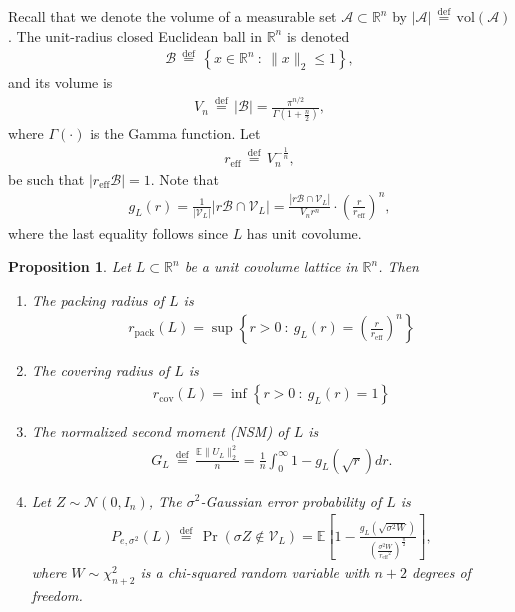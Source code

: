 \documentclass[article,doublecolumn]{IEEEtran}
\newcommand{\EE}{{\mathbb{E}}}
\newcommand{\df}{{\, \stackrel{\mathrm{def}}{=}\, }}
\newcommand{\R}{{\mathbb{R}}}
\newcommand{\AAA}{{\mathcal{A}}}
\newcommand{\Vol}{{\mathrm{vol}}}
\newcommand{\mVL}{{\mathcal{V}_L}}
\newcommand{\mBeuc}{{\mathcal{B}}}
\newcommand{\rpack}{{r_{\mathrm{pack}}}}
\newcommand{\rcov}{{r_{\mathrm{cov}}}}
\newcommand{\reff}{{r_{\mathrm{eff}}}}
\newcommand{\VcdfL}{g_L}
\newcommand{\Pesig}{P_{e,\sigma^2}}
\newtheorem{prop}[thm]{Proposition}
\begin{document}
Recall that we denote the volume of a measurable set $\AAA\subset\R^n$ by $|\AAA|\df\Vol(\AAA)$. The unit-radius closed Euclidean ball in $\R^n$ is denoted
\begin{align}
\mBeuc\df\left\{x\in \R^n~:~\|x\|_2\leq 1 \right\},    
\end{align}
and its volume is
\begin{align}
V_n\df |\mBeuc|=\frac{\pi^{n/2}}{\Gamma(1+\frac{n}{2})},
\label{eq:Vndef}
\end{align}
where $\Gamma(\cdot)$ is the Gamma function. Let
\begin{align}
\reff\df V_n^{-\frac{1}{n}},    
\end{align}
be such that $|\reff \mBeuc|=1$.
Note that
\begin{align}
\VcdfL(r)=\frac{1}{|\mVL|}\left| r\mBeuc\cap \mVL\right|=\frac{\left| r\mBeuc\cap \mVL\right|}{V_n r^n}\cdot\left(\frac{r}{\reff}\right)^n,   
\label{eq:gasIntersecVol}
\end{align}
where the last equality follows since $L$ has unit covolume.


\begin{prop}
\label{prop:fundviacdf}
Let $L\subset \R^n$ be a unit covolume lattice in $\R^n$. Then
\begin{enumerate}
    \item The packing radius of $L$ is
    \begin{align}
     \rpack(L)=\sup\left\{r>0~:~\VcdfL(r)=\left(\frac{r}{\reff} \right)^n \right\}  
    \end{align}
    \item The covering radius of $L$ is
    \begin{align}
     \rcov(L)=\inf\left\{r>0~:~\VcdfL(r)= 1 \right\}  
    \end{align}
    \item The normalized second moment (NSM) of $L$ is
    \begin{align}
     G_L\df \frac{\EE\|U_L\|_2^2}{n}=\frac{1}{n}\int_{0}^{\infty}1-\VcdfL(\sqrt{r}) dr.
    \end{align}
    \label{fund:NSM}
    \item Let $Z\sim\mathcal{N}(0,I_n)$, The $\sigma^2$-Gaussian error probability of $L$ is 
    \begin{align}
     \Pesig(L)\df\Pr(\sigma Z\notin \mVL)=\EE\left[1- \frac{\VcdfL(\sqrt{\sigma^2 W})}{\left(\frac{\sigma^2 W}{\reff^2} \right)^{\frac{n}{2}}} \right],   
    \end{align}
    where $W\sim\chi^2_{n+2}$ is a chi-squared random variable with $n+2$ degrees of freedom.
    \label{fund:GaussPe}
\end{enumerate}
\end{prop}
\end{document}

